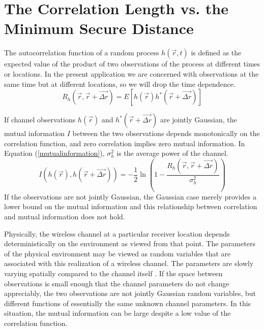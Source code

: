 \documentclass[conference]{ieeetran}
\begin{document}
\section{The Correlation Length vs. the Minimum Secure Distance}
The autocorrelation function of a random process $h(\vec{r},t)$ is defined as the expected value of the product of two observations of the process at different times or locations.  In the present application we are concerned with observations at the same time but at different locations, so we will drop the time dependence.
\begin{equation}\label{ensemblecorr}
R_h(\vec{r},\vec{r}+\vec{\Delta r}) = E[h(\vec{r})h^*(\vec{r}+\vec{\Delta r})]
\end{equation}

If channel observations $h(\vec{r})$ and $h^*(\vec{r}+\vec{\Delta r})$ are jointly Gaussian, the mutual information $I$ between the two observations depends monotonically on the correlation function, and zero correlation implies zero mutual information.  In Equation (\ref{mutualinformation}), $\sigma_h^2$ is the average power of the channel.
\begin{equation}\label{mutualinformation}
I(h(\vec{r}),h(\vec{r}+\vec{\Delta r})) = -\frac{1}{2}\ln\left(1-\frac{R_h(\vec{r},\vec{r}+\vec{\Delta r})}{\sigma_h^2}\right)
\end{equation}
If the observations are not jointly Gaussian, the Gaussian case merely provides a lower bound on the mutual information and this relationship between correlation and mutual information does not hold. %

Physically, the wireless channel   at a particular receiver location depends deterministically on the environment as viewed from that point.  The parameters of the physical environment may be viewed as random variables that are associated with this realization of a wireless channel.  The parameters are slowly varying spatially compared to the channel   itself \cite{jakes1974, duel-hallen2007}.  If the space between observations is small enough that the channel parameters do not change appreciably, the two observations are not jointly Gaussian random variables, but different functions of essentially the same unknown channel parameters.  In this situation, the mutual information can be large despite a low value of the correlation function.
\end{document}
